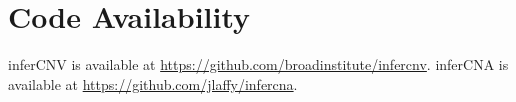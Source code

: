 \documentclass{article}
\begin{document}


\section{Code Availability}
inferCNV is available at \url{https://github.com/broadinstitute/infercnv}. inferCNA is available at \url{https://github.com/jlaffy/infercna}. %
\end{document}
